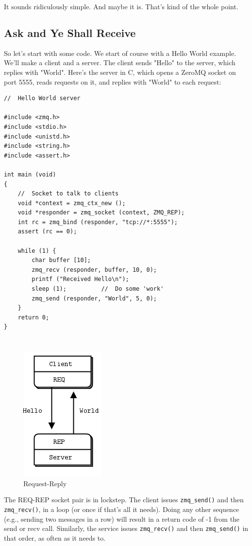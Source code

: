 It sounds ridiculously simple. And maybe it is. That's kind of the whole point.

\subsection{Ask and Ye Shall Receive}

So let's start with some code. We start of course with a Hello World example. We'll make a client and a server. The client sends "Hello" to the server, which replies with "World". Here's the server in C, which opens a ZeroMQ socket on port 5555, reads requests on it, and replies with "World" to each request:
\begin{verbatim}
//  Hello World server

#include <zmq.h>
#include <stdio.h>
#include <unistd.h>
#include <string.h>
#include <assert.h>

int main (void)
{
    //  Socket to talk to clients
    void *context = zmq_ctx_new ();
    void *responder = zmq_socket (context, ZMQ_REP);
    int rc = zmq_bind (responder, "tcp://*:5555");
    assert (rc == 0);

    while (1) {
        char buffer [10];
        zmq_recv (responder, buffer, 10, 0);
        printf ("Received Hello\n");
        sleep (1);          //  Do some 'work'
        zmq_send (responder, "World", 5, 0);
    }
    return 0;
}
\end{verbatim}
\inputminted[baselinestretch=0.8,stripnl=false]{scheme}{../tests/hello-world/server.scm}
\inputminted[baselinestretch=0.8,stripnl=false]{scheme}{../tests/hello-world/server-sugar.scm}

\begin{figure}[H]
\centering
\includegraphics{figures/fig2.png}
\caption{Request-Reply}
\end{figure}
The REQ-REP socket pair is in lockstep. The client issues \Verb|zmq_send()| and
then \Verb|zmq_recv()|, in a loop (or once if that's all it needs). Doing any
other sequence (e.g., sending two messages in a row) will result in a return
code of -1 from the send or recv call. Similarly, the service issues \Verb|zmq_recv()|
and then \Verb|zmq_send()| in that order, as often as it needs to.

